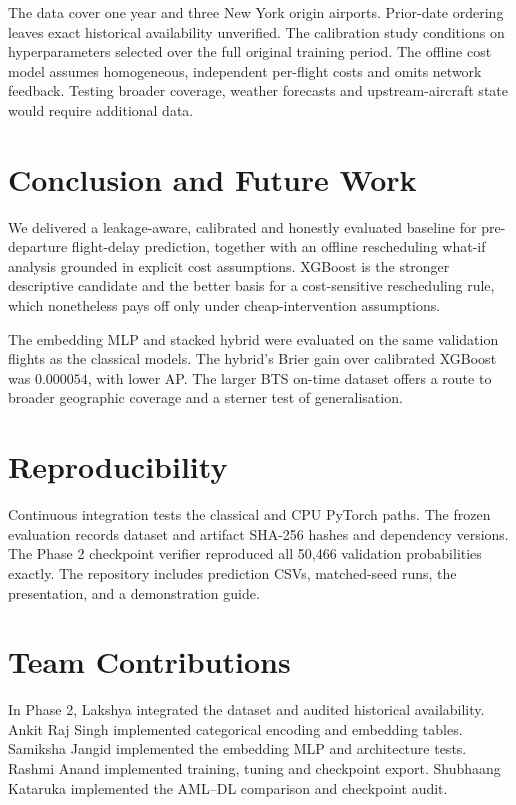 \documentclass[conference]{IEEEtran}
\begin{document}
The data cover one year and three New York origin airports. Prior-date
ordering leaves exact historical availability unverified. The calibration
study conditions on hyperparameters selected over the full original training
period. The offline cost model assumes homogeneous, independent per-flight
costs and omits network feedback. Testing broader coverage, weather forecasts
and upstream-aircraft state would require additional data.

\section{Conclusion and Future Work}
\label{sec:conclusion}
We delivered a leakage-aware, calibrated and honestly evaluated baseline for
pre-departure flight-delay prediction, together with an offline rescheduling
what-if analysis grounded in explicit cost assumptions. XGBoost is the stronger
descriptive candidate and the better basis for a cost-sensitive rescheduling
rule, which nonetheless pays off only under cheap-intervention assumptions.

The embedding MLP and stacked hybrid were evaluated on the same validation
flights as the classical models. The hybrid's Brier gain over calibrated
XGBoost was $0.000054$, with lower AP. The larger BTS on-time dataset offers a
route to broader geographic coverage and a sterner test of generalisation.

\section*{Reproducibility}
Continuous integration tests the classical and CPU PyTorch paths. The frozen
evaluation records dataset and artifact SHA-256 hashes and dependency versions.
The Phase 2 checkpoint verifier reproduced all 50,466 validation probabilities
exactly. The repository includes prediction CSVs, matched-seed runs, the
presentation, and a demonstration guide.

\section*{Team Contributions}
In Phase 2, Lakshya integrated the dataset and audited historical availability.
Ankit Raj Singh implemented categorical encoding and embedding tables.
Samiksha Jangid implemented the embedding MLP and architecture tests.
Rashmi Anand implemented training, tuning and checkpoint export.
Shubhaang Kataruka implemented the AML--DL comparison and checkpoint audit.
\end{document}
